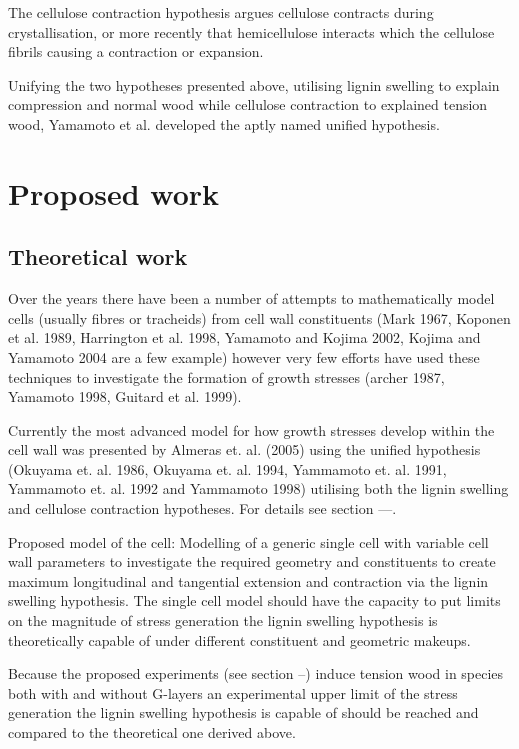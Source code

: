 \documentclass{article}
\begin{document}
The cellulose contraction hypothesis argues cellulose contracts during
crystallisation, or more recently that hemicellulose interacts which the
cellulose fibrils causing a contraction or expansion.

Unifying the two hypotheses presented above, utilising lignin swelling to
explain compression and normal wood while cellulose contraction to explained
tension wood, Yamamoto et al. developed the aptly named unified hypothesis.

\section{Proposed work}
\subsection{Theoretical work}
Over the years there have been a number of attempts to mathematically model
cells (usually fibres or tracheids) from cell wall constituents (Mark 1967,
Koponen et al. 1989, Harrington et al. 1998, Yamamoto and Kojima 2002, Kojima
and Yamamoto 2004 are a few example) however very few efforts have used these
techniques to investigate the formation of growth stresses (archer 1987,
Yamamoto 1998, Guitard et al. 1999).

Currently the most advanced model for how growth stresses develop within the
cell wall was presented by Almeras et. al. (2005) using the unified hypothesis
(Okuyama et. al. 1986, Okuyama et. al. 1994, Yammamoto et. al. 1991, Yammamoto
et. al. 1992 and Yammamoto 1998) utilising both the lignin swelling and
cellulose contraction hypotheses. For details see section ---.

Proposed model of the cell:
Modelling of a generic single cell with variable cell wall parameters to
investigate the required geometry and constituents to create maximum
longitudinal and tangential extension and contraction via the lignin swelling
hypothesis. The single cell model should have the capacity to put limits on the
magnitude of stress generation the lignin swelling hypothesis is theoretically
capable of under different constituent and geometric makeups.

Because the proposed experiments (see section --) induce tension wood in species
both with and without G-layers an experimental upper limit of the stress
generation the lignin swelling hypothesis is capable of should be reached and
compared to the theoretical one derived above.
\end{document}
